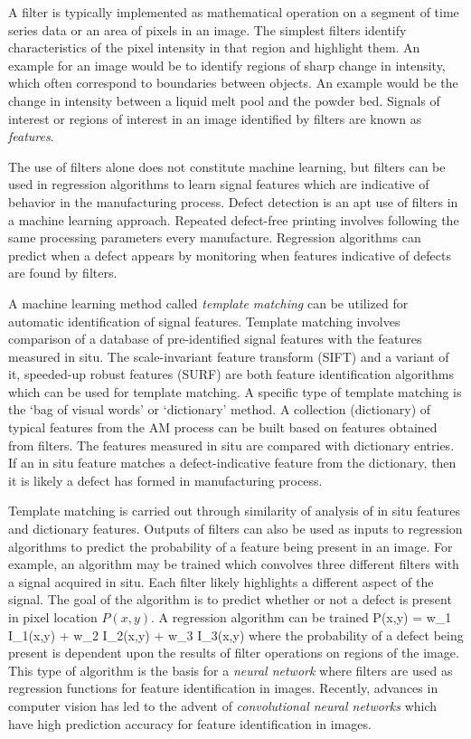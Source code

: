 A filter is typically implemented as mathematical operation on a segment of time series data or an area of pixels in an image. The simplest filters identify characteristics of the pixel intensity in that region and highlight them. An example for an image would be to identify regions of sharp change in intensity, which often correspond to boundaries between objects. An example would be the change in intensity between a liquid melt pool and the powder bed. Signals of interest or regions of interest in an image identified by filters are known as \textit{features}. 

The use of filters alone does not constitute machine learning, but filters can be used in regression algorithms to learn signal features which are indicative of behavior in the manufacturing process. Defect detection is an apt use of filters in a machine learning approach. Repeated defect-free printing involves following the same processing parameters every manufacture. Regression algorithms can predict when a defect appears by monitoring when features indicative of defects are found by filters. 

A machine learning method called  \textit{template matching} can be utilized for automatic identification of signal features. Template matching involves comparison of a database of pre-identified signal features with the features measured in situ. The scale-invariant feature transform (SIFT) \cite{Lowe2004} and a variant of it, speeded-up robust features (SURF) \cite{Bay2008} are both feature identification algorithms which can be used for template matching. A specific type of template matching is the `bag of visual words' or `dictionary' method. A collection (dictionary) of typical features from the AM process can be built based on features obtained from filters. The features measured in situ are compared with dictionary entries. If an in situ feature matches a defect-indicative feature from the dictionary, then it is likely a defect has formed in manufacturing process. 

Template matching is carried out through similarity of analysis of in situ features and dictionary features. Outputs of filters can also be used as inputs to regression algorithms to predict the probability of a feature being present in an image. For example, an algorithm may be trained which convolves three different filters with a signal acquired in situ. Each filter likely highlights a different aspect of the signal. The goal of the algorithm is to predict whether or not a defect is present in pixel location $P(x,y)$. A regression algorithm can be trained
\eqn
	P(x,y) = w_1 I_1(x,y) + w_2 I_2(x,y) + w_3 I_3(x,y)
	\label{filterregress}
\equ
where the probability of a defect being present is dependent upon the results of filter operations on regions of the image. This type of algorithm is the basis for a \textit{neural network} where filters are used as regression functions for feature identification in images. Recently, advances in computer vision has led to the advent of \textit{convolutional neural networks} which have high prediction accuracy for feature identification in images. 

